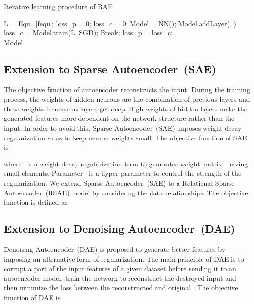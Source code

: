 \documentclass[conference]{IEEEtran}
\begin{document}
	\begin{algorithm}[t]
		\caption{Iterative learning procedure of RAE}
		\label{alg1}
		\begin{algorithmic}[1]
				\State L = Equ.~\ref{fequ};
				\State loss\_p = 0;
				\State loss\_c = 0;
				\State Model = NN();  
					\State Model.addLayer(, )
				\EndFor
					\State loss\_c = Model.train(L, SGD);
						\State Break;
					\Else
						\State loss\_p = loss\_c;	
					\EndIf
				\EndWhile \\
				\Return Model
			\EndFunction
		\end{algorithmic}
	\end{algorithm}
	
	\subsection{Extension to Sparse Autoencoder~(SAE)}
	The objective function of autoencoder reconstructs the input. During the training process, the weights of hidden neurons are the combination of previous layers and these weights increase as layers get deep. High weights of hidden layers make the generated features more dependent on the network structure rather than the input. In order to avoid this, Sparse Autoencoder~(SAE) imposes weight-decay regularization so as to keep neuron weights small. The objective function of SAE is
	
	where~ is a weight-decay regularization term to guarantee weight matrix~ having small elements. Parameter~ is a hyper-parameter to control the strength of the regularization. We extend Sparse Autoencoder~(SAE) to a Relational Sparse Autoencoder~(RSAE) model by considering the data relationships. The objective function is defined as
	
	
	\subsection{Extension to Denoising Autoencoder~(DAE)}
	Denoising Autoencoder~(DAE) is proposed to generate better features by imposing an alternative form of regularization. The main principle of DAE is to corrupt a part of the input features of a given dataset  before sending it to an autoencoder model, train the network to reconstruct the destroyed input  and then minimize the loss between the reconstructed  and original . The objective function of DAE is
	
\end{document}
